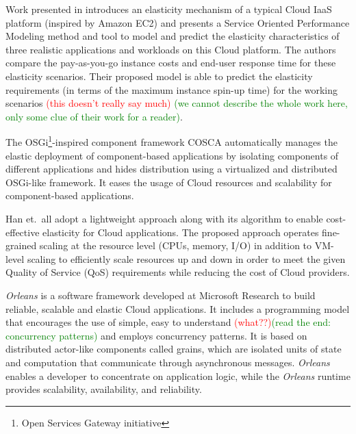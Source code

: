 \documentclass{sig-alternate}
\newcommand\todo[1]{\textcolor{red}{(#1)}}
\newcommand\done[1]{\textcolor{green}{(#1)}}
\begin{document}

Work presented in \cite{brebner2012your} introduces an elasticity mechanism of a typical Cloud IaaS platform (inspired by Amazon EC2) and presents a Service Oriented Performance Modeling method and tool to model and predict the elasticity characteristics of three realistic applications and workloads on this Cloud platform. The authors compare the pay-as-you-go instance costs and end-user response time for these elasticity scenarios. Their proposed model is able to predict the elasticity requirements (in terms of the maximum instance spin-up time) for the working scenarios \todo{this doesn't really say much} \done{we cannot describe the whole work here, only some clue of their work for a reader}.

The OSGi\footnote{Open Services Gateway initiative}-inspired component framework COSCA \cite {kachele2013component} automatically manages the elastic deployment of component-based applications by isolating components of different applications and hides distribution using a virtualized and distributed OSGi-like framework. It eases the usage of Cloud resources and scalability for component-based applications. 

Han et.~all \cite{han2012lightweight} adopt a lightweight approach along with its algorithm to enable cost-effective elasticity for Cloud applications. The proposed approach operates fine-grained scaling at the resource level (CPUs, memory, I/O) in addition to VM-level scaling to efficiently scale resources up and down in order to meet the given Quality of Service (QoS) requirements while reducing the cost of Cloud providers.

\emph{Orleans} \cite{larus2013look,bykov2011orleans} is a software framework developed at Microsoft Research to build reliable, scalable and elastic Cloud applications. It includes a programming model that encourages the use of simple, easy to understand \todo{what??}\done{read the end: concurrency patterns} and employs concurrency patterns. It is based on distributed actor-like components called grains, which are isolated units of state and computation that communicate through asynchronous messages. \emph{Orleans} enables a developer to concentrate on application logic, while the \emph{Orleans} runtime provides scalability, availability, and reliability.
\end{document}
